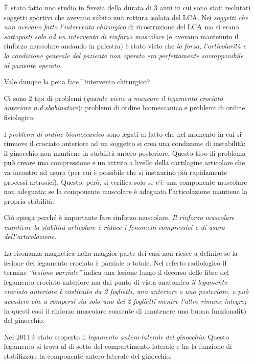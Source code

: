 È stato fatto uno studio in Svezia della durata di 3 anni in cui sono
stati reclutati soggetti sportivi che avevano subito una rottura isolata
del LCA. Nei \emph{soggetti che non avevano fatto l'intervento
chirurgico} di ricostruzione del LCA ma si erano \emph{sottoposti solo
ad un intervento di rinforzo muscolare} (e avevano mantenuto il rinforzo
muscolare andando in palestra) è stato visto che \emph{la forza,
l'articolarità e la condizione generale del paziente non operato era
perfettamente sovrapponibile al paziente operato. }

Vale dunque la pena fare l'intervento chirurgico?

Ci sono 2 tipi di problemi (\emph{quando viene a mancare il legamento
crociato anteriore n.d.sbobinatore}): problemi di ordine biomeccanico e
problemi di ordine fisiologico.

I \emph{problemi di ordine biomeccanico} sono legati al fatto che nel
momento in cui si rimuove il crociato anteriore ad un soggetto si crea
una condizione di instabilità: il ginocchio non mantiene la stabilità
antero-posteriore. Questo tipo di problema può creare una compressione e
un attrito a livello della cartilagine articolare che va incontro ad
usura (per cui è possibile che si instaurino più rapidamente processi
artrosici). Questo, però, si verifica solo se c'è una componente
muscolare non adeguata: se la componente muscolare è adeguata
l'articolazione mantiene la propria stabilità.

Ciò spiega perché è importante fare rinforzo muscolare. \emph{Il
rinforzo muscolare mantiene la stabilità articolare e riduce i fenomeni
compressivi e di usura dell'articolazione.}

La risonanza magnetica nella maggior parte dei casi non riesce a
definire se la lesione del legamento crociato è parziale o totale. Nel
referto radiologico il termine \emph{``lesione parziale''} indica una
lesione lungo il decorso delle fibre del legamento crociato anteriore ma
dal punto di vista anatomico \emph{il legamento crociato anteriore è
costituito da 2 foglietti, uno anteriore e uno posteriore, e può
accadere che a rompersi sia solo uno dei 2 foglietti mentre l'altro
rimane integro}; in questi casi il rinforzo muscolare consente di
mantenere una buona funzionalità del ginocchio.

Nel 2011 è stato scoperto il \emph{legamento antero-laterale del
ginocchio}. Questo legamento si trova al di sotto del compartimento
laterale e ha la funzione di stabilizzare la componente antero-laterale
del ginocchio.

